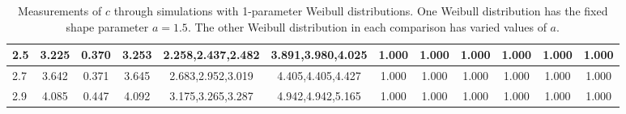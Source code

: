 \begin{table*}[h!]
\begin{center}
\begin{tabular}{| l | c | c | c | c | c | c | c | c | c | c | c |}
2.5 & 3.225 & 0.370 & 3.253 & 2.258,2.437,2.482 & 3.891,3.980,4.025  & 1.000  & 1.000  & 1.000  & 1.000  & 1.000  & 1.000 \\\hline
2.7 & 3.642 & 0.371 & 3.645 & 2.683,2.952,3.019 & 4.405,4.405,4.427  & 1.000  & 1.000  & 1.000  & 1.000  & 1.000  & 1.000 \\\hline
2.9 & 4.085 & 0.447 & 4.092 & 3.175,3.265,3.287 & 4.942,4.942,5.165  & 1.000  & 1.000  & 1.000  & 1.000  & 1.000  & 1.000 \\\hline
\end{tabular}
\caption{Measurements of $c$ through simulations
        with 1-parameter Weibull distributions.
        One Weibull distribution has the fixed shape parameter $a=1.5$.
        The other Weibull distribution in each comparison
        has varied values of $a$.}
\end{center}
\end{table*}